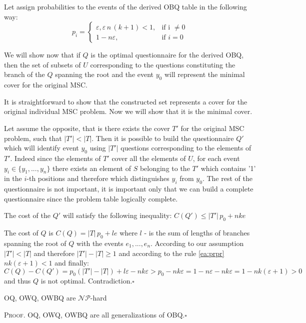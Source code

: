 \documentclass[11pt]{article}
\begin{document}
Let assign probabilities to the events of the derived OBQ table in the following way:
\begin{equation}
p_i = 
   \begin{cases}
      \varepsilon ,\varepsilon\,n\,(k+1)<1,& \text{if i $\neq 0$} \\
      1-n\varepsilon,& \text{if $i=0$}
   \end{cases}
\end{equation}\label{ea:prpr}

We will show now that if $Q$ is the optimal questionnaire for the derived OBQ, then the set of subsets of $U$ corresponding to the questions constituting the branch of the $Q$ spanning the root and the event $y_0$ will represent the minimal cover for the original MSC.

It is straightforward to show that the constructed set represents a cover for the original individual MSC problem. Now we will show that it is the minimal cover.

Let assume the opposite, that is there exists the cover $T'$ for the original MSC problem, such that $|T'|<|T|$. Then it is possible to build the questionnaire $Q'$ which will identify event $y_0$ using $|T'|$ questions corresponding to the elements of $T'$. Indeed since the elements of $T'$ cover all the elements of $U$, for each event $y_i \in \{y_1,...,y_n\}$ there exists an element of $S$ belonging to the $T'$ which contains '1' in the $i$-th positions and therefore which distinguishes $y_i$ from $y_0$. The rest of the questionnaire is not important, it is important only that we can build a complete questionnaire since the problem table logically complete.

The cost of the $Q'$ will satisfy the following inequality:
$C(Q') \le |T'|\,p_0 + nke$

The cost of $Q$ is $C(Q)=|T|\,p_0+le$ where $l$ - is the sum of lengths of branches spanning the root of $Q$ with the events $e_1,...,e_n$. According to our assumption $|T'|<|T|$ and therefore $|T'|-|T|\geq1$ and according to the rule \ref{ea:prpr} $nk(\varepsilon + 1)<1$ and finally: 
$C(Q)-C(Q') = p_0(|T'|-|T|)+l\varepsilon-nk\varepsilon>p_0-nk\varepsilon=1-n\varepsilon-nk\varepsilon=1-nk(\varepsilon+1)>0$ and thus $Q$ is not optimal. Contradiction.$\square$

\begin{Mystat}  
OQ, OWQ, OWBQ are $\mathcal{NP}$-hard
\end{Mystat}\label{st:q_np}
{\scshape Proof}. OQ, OWQ, OWBQ are all generalizations of OBQ.$\square$
\end{document}
